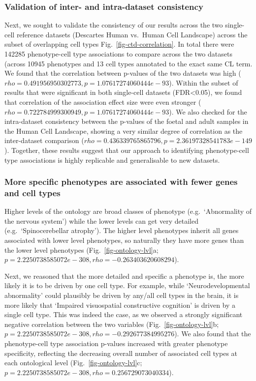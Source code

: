 \documentclass[
]{article}
\begin{document}
\subsubsection{Validation of inter- and intra-dataset
consistency}\label{validation-of-inter--and-intra-dataset-consistency}

Next, we sought to validate the consistency of our results across the
two single-cell reference datasets (Descartes Human vs.~Human Cell
Landscape) across the subset of overlapping cell types
Fig.~\ref{fig-ctd-correlation}. In total there were 142285
phenotype-cell type associations to compare across the two datasets
(across 10945 phenotypes and 13 cell types annotated to the exact same
CL term. We found that the correlation between p-values of the two
datasets was high (\(rho=0.491956950302773, p=1.07617274060444e-93\)).
Within the subset of results that were significant in both single-cell
datasets (FDR\textless0.05), we found that correlation of the
association effect size were even stronger
(\(rho=0.722784999300949, p=1.07617274060444e-93\)). We also checked for
the intra-dataset consistency between the p-values of the foetal and
adult samples in the Human Cell Landscape, showing a very similar degree
of correlation as the inter-dataset comparison
(\(rho=0.436339765865796, p=2.36197328541783e-149\)). Together, these
results suggest that our approach to identifying phenotype-cell type
associations is highly replicable and generalisable to new datasets.

\subsubsection{More specific phenotypes are associated with fewer genes
and cell
types}\label{more-specific-phenotypes-are-associated-with-fewer-genes-and-cell-types}

Higher levels of the ontology are broad classes of phenotype
(e.g.~`Abnormality of the nervous system') while the lower levels can
get very detailed (e.g.~`Spinocerebellar atrophy'). The higher level
phenotypes inherit all genes associated with lower level phenotypes, so
naturally they have more genes than the lower level phenotypes
(Fig.~\ref{fig-ontology-lvl}a;
\(p=2.2250738585072e-308, rho=-0.263403620608294\)).

Next, we reasoned that the more detailed and specific a phenotype is,
the more likely it is to be driven by one cell type. For example, while
`Neurodevelopmental abnormality' could plausibly be driven by any/all
cell types in the brain, it is more likely that `Impaired visuospatial
constructive cognition' is driven by a single cell type. This was indeed
the case, as we observed a strongly significant negative correlation
between the two variables (Fig.~\ref{fig-ontology-lvl}b;
\(p=2.2250738585072e-308, rho=-0.292677384995276\)). We also found that
the phenotype-cell type association p-values increased with greater
phenotype specificity, reflecting the decreasing overall number of
associated cell types at each ontological level
(Fig.~\ref{fig-ontology-lvl}c;
\(p=2.2250738585072e-308, rho=0.256729073040334\)).
\end{document}
